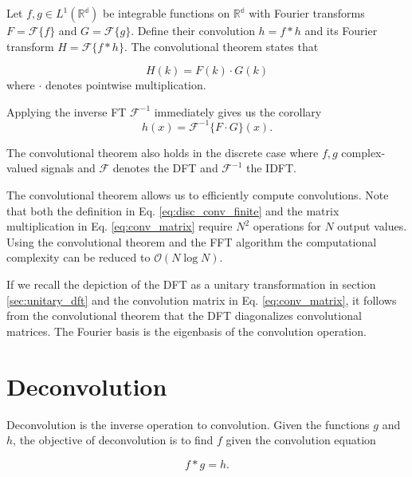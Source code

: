 \begin{theorem}
    Let $f, g \in L^1(\mathbb{R^d})$ be integrable functions on $\mathbb{R^d}$ with Fourier transforms $F=\mathscr{F}\{f\}$ and $G=\mathscr{F}\{g\}$.
    Define their convolution $h = f \ast h$ and its Fourier transform $H = \mathscr{F} \{ f \ast h \}$. The convolutional theorem states that

    \begin{equation}
        H(k) = F(k) \cdot G(k)
    \end{equation}
    where $\cdot$ denotes pointwise multiplication.

    Applying the inverse FT $\mathscr{F}^{-1}$ immediately gives us the corollary
    \begin{equation}
        h(x) = \mathscr{F}^{-1} \{ F \cdot G \}(x).
    \end{equation}

    The convolutional theorem also holds in the discrete case where $f, g$ complex-valued signals and $\mathscr{F}$ denotes the DFT and $\mathscr{F}^{-1}$
    the IDFT.
    \label{th:conv_theorem}
\end{theorem}

The convolutional theorem allows us to efficiently compute convolutions. Note that both the definition in Eq. \ref{eq:disc_conv_finite} and the matrix
multiplication in Eq. \ref{eq:conv_matrix} require $N^2$ operations for $N$ output values. Using the convolutional theorem and the FFT algorithm
the computational complexity can be reduced to $\mathcal{O}(N \log N)$.

If we recall the depiction of the DFT as a unitary transformation in section \ref{sec:unitary_dft} and the convolution matrix in Eq. \ref{eq:conv_matrix}, 
it follows from the convolutional theorem that the DFT diagonalizes convolutional matrices. The Fourier basis is the eigenbasis of the convolution
operation.

\section{Deconvolution}

Deconvolution is the inverse operation to convolution. Given the functions $g$ and $h$, the objective of deconvolution is to find $f$ given the 
convolution equation 

\begin{equation}
    f \ast g = h.
    \label{eq:conv_eq}
\end{equation}

